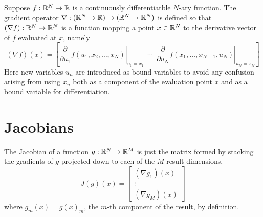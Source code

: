 \documentclass[10pt]{article}
\begin{document}
Suppose $f : \mathbb{R}^N \rightarrow \mathbb{R}$ is a continuously
differentiatble $N$-ary function.  The gradient operator
$\nabla:(\mathbb{R}^N \rightarrow \mathbb{R})\rightarrow (\mathbb{R}^N \rightarrow
\mathbb{R}^N)$ is defined so that $(\nabla f):\mathbb{R}^N \rightarrow
\mathbb{R}^N$ is a function mapping a point $x \in \mathbb{R}^N$ to the
derivative vector of $f$ evaluated at $x$, namely
%
\[
(\nabla f)(x) 
= 
\left[
  \left. 
    \frac{\partial}{\partial u_1} f(u_1,x_2,\ldots,x_N)
  \right|_{u_1 = x_1}
  \ \ \cdots \ \ 
  \left. 
    \frac{\partial}{\partial u_N}  f(x_1,\ldots,x_{N-1},u_N)
   \right|_{u_N = x_N}
\right]
\]
%
Here new variables $u_n$ are introduced as bound variables to
avoid any confusion arising from using $x_n$ both as a component of
the evaluation point $x$ and as a bound variable for differentiation.

\section{Jacobians}

The Jacobian of a function $g : \mathbb{R}^N \rightarrow \mathbb{R}^M$ is just
the matrix formed by stacking the gradients of $g$ projected down to
each of the $M$ result dimensions,
%
\[
J(g)(x) = 
\left[
\begin{array}{c}
(\nabla g_1)(x)
\\[2pt]
\vdots
\\[2pt]
(\nabla g_M)(x)
\end{array}
\right]
\]
%
where $g_m(x) = g(x)_m$, the $m$-th component of the result, by definition.

\clearpage
\nocite{Hogan:2014}
\nocite{Neal:2003}



\end{document}
